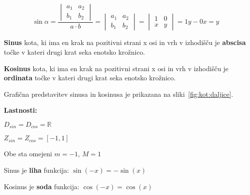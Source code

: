 \documentclass[a4paper,oneside,12pt,fleqn]{article}
\def\R{\ensuremath{\mathbb R}}
\newcommand\krat\cdot
\def\kos{\cos}
\numberwithin{equation}{section}
\newenvironment{enumerate*}%
{
\vspace{-12pt}%
\begin{enumerate}%
\setlength{\itemsep}{0pt}%
\setlength{\parskip}{2pt}}%
{\end{enumerate}}
\begin{document}
\begin{equation}
  \sin\alpha = \frac{\begin{vmatrix} a_1 & a_2 \\ b_1 & b_2 \end{vmatrix}}{a\krat b} =
  \begin{vmatrix} a_1 & a_2 \\ b_1 & b_2 \end{vmatrix} =
  \begin{vmatrix} 1 & 0 \\ x & y \end{vmatrix} = 1y - 0x = y
  \label{eq:kot:sindef}
\end{equation}


\textbf{Sinus} kota, ki ima en krak na pozitivni strani x osi in vrh v izhodišču je
\textbf{abscisa} točke v kateri drugi krat seka enotsko krožnico.

\textbf{Kosinus} kota, ki ima en krak na pozitivni strani x osi in vrh v izhodišču je
\textbf{ordinata} točke v kateri drugi krat seka enotsko krožnico.

Grafična predstavitev sinusa in kosinusa je prikazana na sliki~\ref{fig:kot:daljice}.

\textbf{Lastnosti:}
\begin{enumerate*}
  \item $D_{sin} = D_{cos} = \R$
  \item $Z_{sin} = Z_{cos} = [-1,1]$
  \item Obe sta omejeni $m = -1$, $M = 1$
  \item Sinus je \textbf{liha} funkcija: $\sin(-x) = -\sin(x)$
  \item Kosinus je \textbf{soda} funkcija: $\kos(-x) = \kos(x)$
\end{enumerate*}
\end{document}

